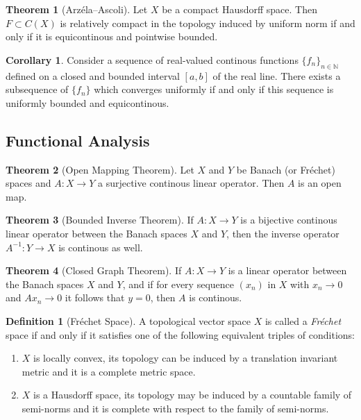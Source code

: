 \documentclass[a4paper]{article}
\newcommand{\NN}{\mathbb{N}}
\newcommand{\lra}{\longrightarrow}
\theoremstyle{definition}
\newtheorem{thm}{Theorem}
\newtheorem{cor}{Corollary}
\theoremstyle{definition}
\newtheorem{definition}{Definition}
\theoremstyle{remark}
\theoremstyle{remark}
\begin{document}
\begin{thm}[Arz\'ela--Ascoli]
  Let $X$ be a compact Hausdorff space. Then $F\subset C(X)$ is relatively compact in the topology induced by uniform norm if and only if it is equicontinous and pointwise bounded.
\end{thm}

\begin{cor}
  Consider a sequence of real-valued continous functions $\{f_n\}_{n\in\NN}$ defined on a closed and bounded interval $[a,b]$ of the real line. There exists a subsequence of $\{f_n\}$ which converges uniformly if and only if this sequence is uniformly bounded and equicontinous.
\end{cor}

\subsection{Functional Analysis}

\begin{thm}[Open Mapping Theorem]
  Let $X$ and $Y$ be Banach (or Fr\'echet) spaces and $A:X\lra Y$ a surjective continous linear operator. Then $A$ is an open map.
\end{thm}

\begin{thm}[Bounded Inverse Theorem]
  If $A:X\lra Y$ is a bijective continous linear operator between the Banach spaces $X$ and $Y$, then the inverse operator $A^{-1}:Y\lra X$ is continous as well.
\end{thm}

\begin{thm}[Closed Graph Theorem]
   If $A:X\lra Y$ is a linear operator between the Banach spaces $X$ and $Y$, and if for every sequence $(x_n)$ in $X$ with $x_n\lra 0$ and $Ax_n\lra 0$ it follows that $y=0$, then $A$ is continous.
\end{thm}

\begin{definition}[Fr\'echet Space]
  A topological vector space $X$ is called a \emph{Fr\'echet} space if and only if it satisfies one of the following equivalent triples of conditions:
  \begin{enumerate}
    \item $X$ is locally convex, its topology can be induced by a translation invariant metric and it is a complete metric space.
    \item $X$ is a Hausdorff space, its topology may be induced by a countable family of semi-norms and it is complete with respect to the family of semi-norms.
  \end{enumerate}
\end{definition}
\end{document}
